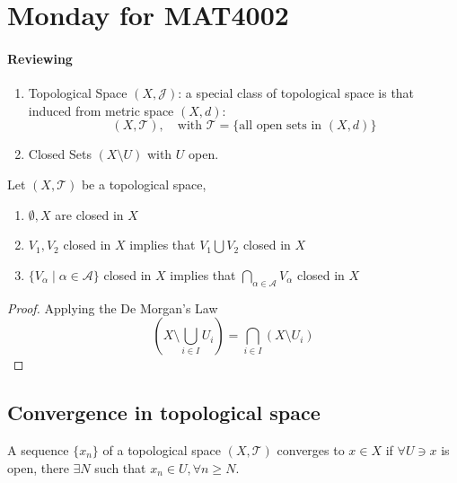 \section{Monday for MAT4002}

\paragraph{Reviewing}
\begin{enumerate}
\item
Topological Space $(X,\mathcal{J})$: a special class of topological space is that induced from metric space $(X,d)$:
\[
(X,\mathcal{T}),\quad\text{with }\mathcal{T}=\{\text{all open sets in $(X,d)$}\}
\]
\item
Closed Sets $(X\setminus U)$ with $U$ open.
\end{enumerate}

\begin{proposition}
Let $(X,\mathcal{T})$ be a topological space, 
\begin{enumerate}
\item
$\emptyset, X$ are closed in $X$
\item
$V_1,V_2$ closed in $X$ implies that $V_1\bigcup V_2$ closed in $X$
\item
$\{V_\alpha\mid\alpha\in\mathcal{A}\}$ closed in $X$ implies that $\bigcap_{\alpha\in\mathcal{A}}V_\alpha$ closed in $X$
\end{enumerate}
\end{proposition}
\begin{proof}
Applying the De Morgan's Law
\[
(X\setminus\bigcup_{i\in I}U_i)=\bigcap_{i\in I}(X\setminus U_i)
\]
\end{proof}

\subsection{Convergence in topological space}

\begin{definition}[Convergence]
A sequence $\{x_n\}$ of a topological space $(X,\mathcal{T})$ converges to $x\in X$ 
if $\forall U\ni x$ is open, there $\exists N$ such that $x_n\in U,\forall n\ge N$.
\end{definition}

